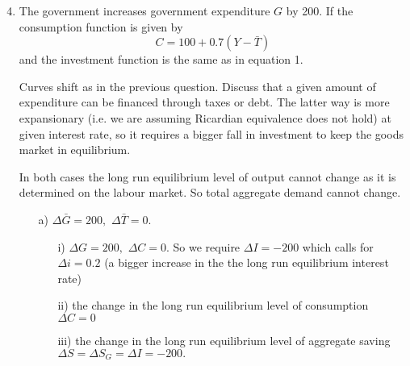 \documentclass[12pt,a4paper]{article}
\begin{document}
\begin{enumerate}



\setcounter{enumi}{3}
\item The government increases government expenditure $G$ by 200. If
  the consumption function is given by%
  \begin{equation}
    C=100+0.7(Y-\bar{T})
  \end{equation}
  and the investment function is the same as in equation 1.

  Curves shift as in the previous question.  Discuss that a given amount
  of expenditure can be financed through taxes or debt. The latter way
  is more expansionary (i.e. we are assuming Ricardian equivalence does
  not hold) at given interest rate, so it requires a bigger fall in
  investment to keep the goods market in equilibrium.

  In both cases the long run equilibrium level of output cannot
  change as it is determined on the labour market. So total aggregate
  demand cannot change.

  \begin{enumerate}

  \item[a)] $\Delta\bar{G}=200,$ $\Delta\bar{T}=0.$

    \begin{enumerate}
    \item [i)]$\Delta G=200,$ $\Delta C=0.$ So we require $\Delta
      I=-200$ which calls for $\Delta i=0.2$ (a bigger increase in the
      the long run equilibrium interest rate)

    \item[ii)] the change in the long run equilibrium level of
      consumption $\Delta C=0$

    \item[iii)] the change in the long run equilibrium level of
      aggregate saving $\Delta S=\Delta S_{G}=\Delta I=-200.$
    \end{enumerate}


\end{enumerate}
\end{enumerate}
\end{document}
